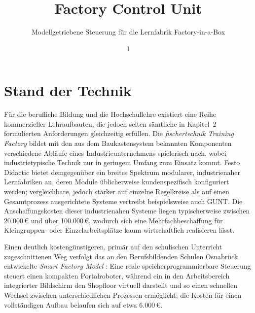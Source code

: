 \documentclass[]{article}%
\title{Factory Control Unit}
\subtitle{Modellgetriebene Steuerung für die Lernfabrik Factory-in-a-Box}
\author{1}{Klaus M. Liebler}
\affil{1}{Hochschule Osnabrück, Fakultät für Ingenieurwissenschaften und Informatik, Osnabrück, Deutschland}
\begin{document}
\setcounter{page}{1}
\maketitle





\section{Stand der Technik}

Für die berufliche Bildung und die Hochschullehre existiert eine Reihe kommerzieller Lehraufbauten, die jedoch selten sämtliche in Kapitel~2 formulierten Anforderungen gleichzeitig erfüllen. Die \emph{fischertechnik Training Factory} \cite{fischertechnik} bildet mit den aus dem Baukastensystem bekannten Komponenten verschiedene Abläufe eines Industrieunternehmens spielerisch nach, wobei industrietypische Technik nur in geringem Umfang zum Einsatz kommt. Festo Didactic bietet demgegenüber ein breites Spektrum modularer, industrienaher Lernfabriken an, deren Module üblicherweise kundenspezifisch konfiguriert werden; vergleichbare, jedoch stärker auf einzelne Regelkreise als auf einen Gesamtprozess ausgerichtete Systeme vertreibt beispielsweise auch GUNT. Die Anschaffungskosten dieser industrienahen Systeme liegen typischerweise zwischen 20.000\,€ und über 100.000\,€, wodurch sich eine Mehrfachbeschaffung für Kleingruppen- oder Einzelarbeitsplätze kaum wirtschaftlich realisieren lässt.

Einen deutlich kostengünstigeren, primär auf den schulischen Unterricht zugeschnittenen Weg verfolgt das an den Berufsbildenden Schulen Osnabrück entwickelte \emph{Smart Factory Model} \cite{strating2023}: Eine reale speicherprogrammierbare Steuerung steuert einen kompakten Portalroboter, während ein in den Arbeitsbereich integrierter Bildschirm den Shopfloor virtuell darstellt und so einen schnellen Wechsel zwischen unterschiedlichen Prozessen ermöglicht; die Kosten für einen vollständigen Aufbau belaufen sich auf etwa 6.000\,€.
\end{document}

